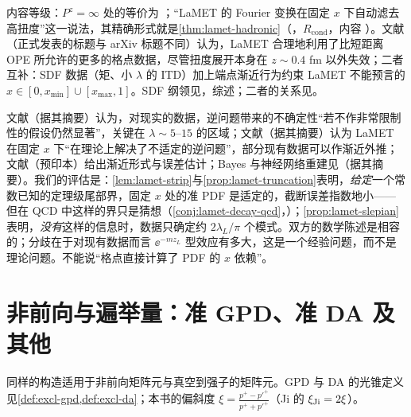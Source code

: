 内容等级：$P^z=\infty$ 处的等价为 \tagA；“LaMET 的 Fourier 变换在固定 $x$ 下自动滤去高扭度”这一说法\cite{Ji:2022ezo}，其精确形式就是\cref{thm:lamet-hadronic}（\tagR，$R_{\mathrm{cond}}$，内容 \tagC）。文献\cite{Ji:2022ezo}（正式发表的标题与 arXiv 标题不同）认为，LaMET 合理地利用了比短距离 OPE 所允许的更多的格点数据，尽管扭度展开本身在 $z\sim0.4$ fm 以外失效；二者互补：SDF 数据（矩、小 $\lambda$ 的 ITD）加上端点渐近行为约束 LaMET 不能预言的 $x\in[0,x_{\min}]\cup[x_{\max},1]$。SDF 纲领见\cite{Radyushkin2017,Radyushkin:2017lvu,Radyushkin:2018cvn,Orginos:2017kos,Karpie:2018zaz,Joo:2019jct,Joo:2020spy}，综述\cite{Radyushkin:2019mye}；二者的关系见\cite{IzubuchiEtAl2018}。

\begin{remark}\label{rem:lamet-inverse-problem}
文献\cite{Dutrieux:2025jed}（据其摘要）认为，对现实的数据，逆问题带来的不确定性“若不作非常限制性的假设仍然显著”，关键在 $\lambda\sim5$--$15$ 的区域；文献\cite{Chen:2025cxr}（据其摘要）认为 LaMET 在固定 $x$ 下“在理论上解决了不适定的逆问题”，部分现有数据可以作渐近外推；文献\cite{Ji:2026vir}（预印本）给出渐近形式与误差估计；Bayes 与神经网络重建见\cite{Karpie:2019eiq}（据其摘要）。我们的评估是：\cref{lem:lamet-strip}与\cref{prop:lamet-truncation}表明，\emph{给定}一个常数已知的定理级尾部界，固定 $x$ 处的准 PDF 是适定的，截断误差指数地小——但在 QCD 中这样的界只是猜想（\cref{conj:lamet-decay-qcd}，\tagC）；\cref{prop:lamet-slepian}表明，\emph{没有}这样的信息时，数据只确定约 $2\lambda_L/\pi$ 个模式。双方的数学陈述是相容的；分歧在于对现有数据而言 $\ee^{-mz_L}$ 型效应有多大，这是一个经验问题，而不是理论问题。不能说“格点直接计算了 PDF 的 $x$ 依赖”。
\end{remark}

\section{非前向与遍举量：准 GPD、准 DA 及其他}\label{sec:lamet-offforward}

同样的构造适用于非前向矩阵元与真空到强子的矩阵元。GPD 与 DA 的光锥定义见\cref{def:excl-gpd,def:excl-da}；本书的偏斜度 $\xi=\frac{p^+-p'^+}{p^++p'^+}$（Ji 的 $\xi_{\rm Ji}=2\xi$）。

